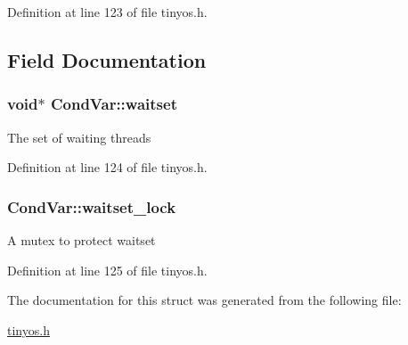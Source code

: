 Definition at line 123 of file tinyos.\+h.



\subsection{Field Documentation}
\subsubsection[{\texorpdfstring{waitset}{waitset}}]{\setlength{\rightskip}{0pt plus 5cm}void$\ast$ Cond\+Var\+::waitset}\hypertarget{structCondVar_a7da9e0169713c3b3ae386a8ab49f7e34}{}\label{structCondVar_a7da9e0169713c3b3ae386a8ab49f7e34}
The set of waiting threads 

Definition at line 124 of file tinyos.\+h.

\subsubsection[{\texorpdfstring{waitset\+\_\+lock}{waitset_lock}}]{ Cond\+Var\+::waitset\+\_\+lock}\hypertarget{structCondVar_a477b855f4d3880d231206ae79bd5b6cf}{}\label{structCondVar_a477b855f4d3880d231206ae79bd5b6cf}
A mutex to protect {\ttfamily waitset} 

Definition at line 125 of file tinyos.\+h.



The documentation for this struct was generated from the following file\+:\begin{DoxyCompactItemize}
\item 
\hyperlink{tinyos_8h}{tinyos.\+h}\end{DoxyCompactItemize}
